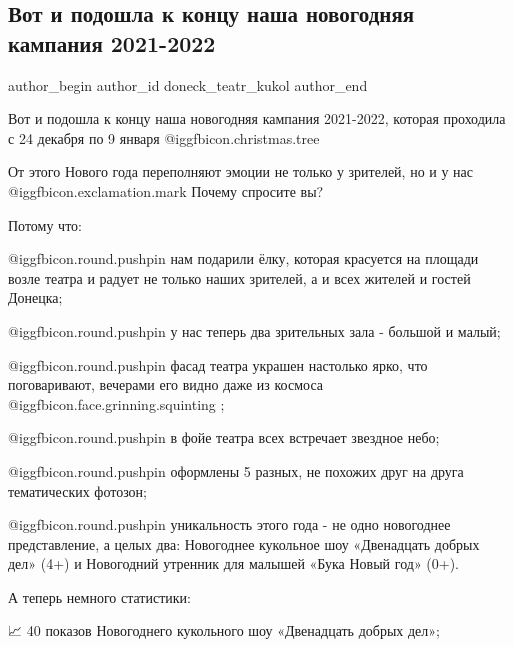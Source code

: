  
 
 
 
 
\subsection{Вот и подошла к концу наша новогодняя кампания 2021-2022}
\label{sec:10_01_2022.vk.doneck_teatr_kukol.1.novgod_kampania}

\ifcmt
 author_begin
   author_id doneck_teatr_kukol
 author_end
\fi

Вот и подошла к концу наша новогодняя кампания 2021-2022, которая проходила с
24 декабря по 9 января  @igg{fbicon.christmas.tree} 

От этого Нового года переполняют эмоции не только у зрителей, но и у нас @igg{fbicon.exclamation.mark}
Почему спросите вы?

Потому что:

 @igg{fbicon.round.pushpin} нам подарили ёлку, которая красуется на площади возле театра и радует не
только наших зрителей, а и всех жителей и гостей Донецка;

 @igg{fbicon.round.pushpin} у нас теперь два зрительных зала - большой и малый;

 @igg{fbicon.round.pushpin} фасад театра украшен настолько ярко, что поговаривают, вечерами его видно
даже из космоса  @igg{fbicon.face.grinning.squinting} ;

 @igg{fbicon.round.pushpin} в фойе театра всех встречает звездное небо;

 @igg{fbicon.round.pushpin} оформлены 5 разных, не похожих друг на друга тематических фотозон;

 @igg{fbicon.round.pushpin} уникальность этого года - не одно новогоднее представление, а целых два:
Новогоднее кукольное шоу «Двенадцать добрых дел» (4+) и Новогодний утренник для
малышей «Бука Новый год» (0+).

А теперь немного статистики:

📈 40 показов Новогоднего кукольного шоу «Двенадцать добрых дел»;

